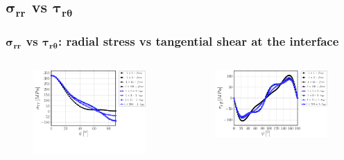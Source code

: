 \documentclass[first,firstsupp,lastsupp,last,hyperref,table]{ETHclass}
\begin{document}
\subsection{$\mathbf{\sigma_{rr}}$ vs $\mathbf{\tau_{r\theta}}$}

\begin{frame}
\frametitle{\vspace{0.2cm}\small $\mathbf{\sigma_{rr}}$ vs $\mathbf{\tau_{r\theta}}$: radial stress vs tangential shear at the interface}
\vspace{-.75cm}
\centering
\begin{columns}[c]
\centering
\begin{column}{0.5\textwidth}
\centering
\begin{figure}
\centering
\includegraphics[width=\columnwidth]{vf60-nodamage-sigmar-notol.pdf}
\end{figure}
\end{column}
\begin{column}{0.5\textwidth}
\centering
\begin{figure}
\centering
\includegraphics[width=\columnwidth]{vf60-nodamage-taurt.pdf}

\end{figure}
\end{column}
\end{columns}
\end{frame}
\end{document}
